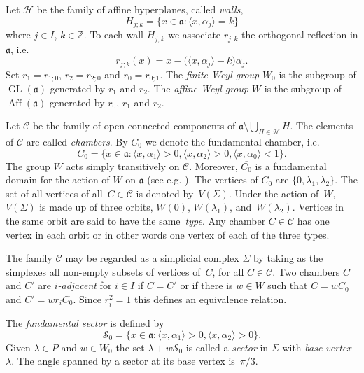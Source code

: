 \documentclass[a4paper]{amsart}
\newcommand{\defn}[1]{\emph{#1}}
\newcommand{\sprod}[2]{{\langle #1, #2\rangle}}
\newcommand{\GL}{\operatorname{GL}}
\newcommand{\Aff}{\operatorname{Aff}}
\newcommand{\ZZ}{\mathbb{Z}}
\theoremstyle{plain}
\theoremstyle{definition}
\theoremstyle{remark}
\numberwithin{equation}{section}
\theoremstyle{plain}
\begin{document}
Let $\mathcal{H}$ be the family of affine hyperplanes, called
\defn{walls},
\begin{equation*}
H_{j; k}=\{x \in \mathfrak{a}: \sprod{x}{\alpha_j} = k\}
\end{equation*}
where $j \in I$, $k \in \ZZ$. To each wall $H_{j; k}$ we associate
$r_{j;k}$ the orthogonal reflection in $\mathfrak{a}$, i.e.
\begin{equation*}
r_{j; k} (x) = x - \big(\sprod{x}{\alpha_j} - k\big) \alpha_j.
\end{equation*}
Set $r_1 = r_{1; 0}$, $r_2 = r_{2; 0}$ and $r_0 = r_{0; 1}$. The
\emph{finite Weyl group} $W_0$ is the subgroup of $\GL(\mathfrak{a})$
generated by $r_1$ and $r_2$. The \emph{affine Weyl group} $W$ is the
subgroup of $\Aff(\mathfrak{a})$ generated by $r_0$, $r_1$ and $r_2$.

Let $\mathcal{C}$ be the family of open connected components of
$\mathfrak{a} \setminus \bigcup_{H \in \mathcal{H}} H$. The elements
of $\mathcal{C}$ are called \emph{chambers}. By $C_0$ we denote the
fundamental chamber, i.e.
\begin{equation*}
	C_0 = \{x \in \mathfrak{a}: \sprod{x}{\alpha_1} > 0,
        \sprod{x}{\alpha_2} > 0, \sprod{x}{\alpha_0} < 1\}.
\end{equation*}
The group $W$ acts simply transitively on $\mathcal{C}$. Moreover,
$\overline{C_0}$ is a fundamental domain for the action of $W$ on
$\mathfrak{a}$ (see e.g. \cite[VI, \S 1-3]{bour}).  The vertices of
$C_0$ are $\{0, \lambda_1, \lambda_2\}$.  The set of all vertices of
all~$C\in\mathcal{C}$ is denoted by~$V(\Sigma)$.  Under the action
of~$W$, $V(\Sigma)$ is made up of three orbits, $W(0)$,
$W(\lambda_1)$, and~$W(\lambda_2)$.  Vertices in the same orbit are
said to have the same~\defn{type}.  Any chamber $C\in\mathcal{C}$ has
one vertex in each orbit or in other words one vertex of each of the
three types.

The family $\mathcal{C}$ may be regarded as a simplicial complex
$\Sigma$ by taking as the simplexes all non-empty subsets of vertices
of~$C$, for all $C \in \mathcal{C}$.  Two chambers $C$ and $C'$ are
\defn{$i$-adjacent} for $i \in I$ if $C = C'$ or if there is $w \in W$
such that $C=wC_0$ and $C'=wr_iC_0$.  Since $r_i^2=1$ this defines an
equivalence relation.

The \defn{fundamental sector} is defined by 
\begin{equation*}
	\mathcal{S}_0 = \{x \in \mathfrak{a}: \sprod{x}{\alpha_1} > 0, \sprod{x}{\alpha_2} > 0\}.
\end{equation*}
Given $\lambda \in P$ and $w \in W_0$ the set $\lambda + w
\mathcal{S}_0$ is called a \defn{sector} in $\Sigma$ with \defn{base
  vertex} $\lambda$.  The angle spanned by a sector at its base vertex
is~$\pi/3$.
\end{document}
